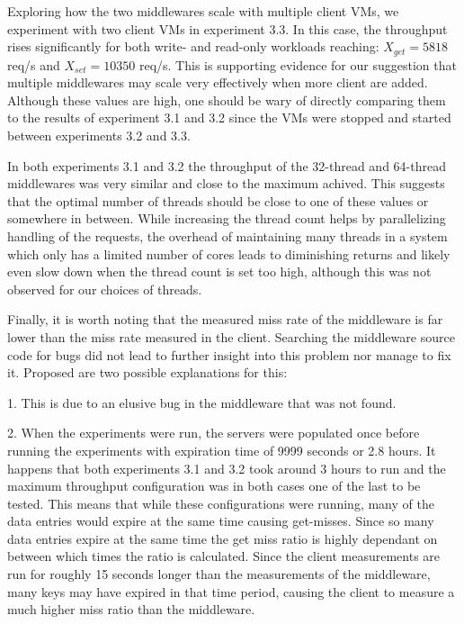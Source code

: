 \documentclass[11pt,a4paper]{article}
\begin{document}
Exploring how the two middlewares scale with multiple client VMs, we experiment with two client VMs in experiment 3.3. In this case, the throughput rises significantly for both write- and read-only workloads reaching: $X_{get} = 5818$ req/s and $X_{set} = 10350$ req/s. This is supporting evidence for our suggestion that multiple middlewares may scale very effectively when more client are added. Although these values are high, one should be wary of directly comparing them to the results of experiment 3.1 and 3.2 since the VMs were stopped and started between experiments 3.2 and 3.3.

In both experiments 3.1 and 3.2 the throughput of the 32-thread and 64-thread middlewares was very similar and close to the maximum achived. This suggests that the optimal number of threads should be close to one of these values or somewhere in between. While increasing the thread count helps by parallelizing handling of the requests, the overhead of maintaining many threads in a system which only has a limited number of cores leads to diminishing returns and likely even slow down when the thread count is set too high, although this was not observed for our choices of threads.

Finally, it is worth noting that the measured miss rate of the middleware is far lower than the miss rate measured in the client. Searching the middleware source code for bugs did not lead to further insight into this problem nor manage to fix it. Proposed are two possible explanations for this:

1. This is due to an elusive bug in the middleware that was not found.

2. When the experiments were run, the servers were populated once before running the experiments with expiration time of 9999 seconds or 2.8 hours. It happens that both experiments 3.1 and 3.2 took around 3 hours to run and the maximum throughput configuration was in both cases one of the last to be tested. This means that while these configurations were running, many of the data entries would expire at the same time causing get-misses. Since so many data entries expire at the same time the get miss ratio is highly dependant on between which times the ratio is calculated. Since the client measurements are run for roughly 15 seconds longer than the measurements of the middleware, many keys may have expired in that time period, causing the client to measure a much higher miss ratio than the middleware.


\newpage
\end{document}
